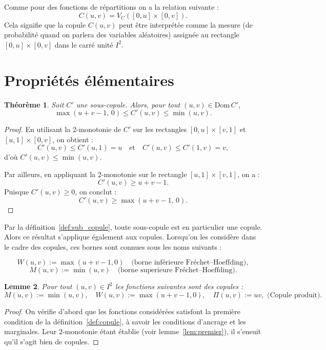 \documentclass[a4paper,11pt]{amsbook}
\numberwithin{equation}{chapter}
\newtheorem{theoreme}			     {Théorème}	[chapter]
\newtheorem{lemme}	    [theoreme]	 {Lemme}
\theoremstyle{definition}
\begin{document}
Comme pour des fonctions de répartitions on a la relation suivante :
\[
C(u,v) = V_C([0,u] \times [0,v]).
\]
Cela signifie que la copule \( C(u,v) \) peut être interprétée comme la mesure (de probabilité quand on parlera des variables aléatoires) assignée au rectangle \( [0,u] \times [0,v] \) dans le carré unité \( I^2\).


\section{Propriétés élémentaires}

\begin{theoreme}\label{thm:sub_copula_fretchet}
Soit \( C' \) une sous-copule. Alors, pour tout \( (u,v) \in \mathrm{Dom}\, C' \),
\[
\max(u+v-1,\, 0) \leq C'(u,v) \leq \min(u,v).
\]
\end{theoreme}

\begin{proof}
En utilisant la 2-monotonie de \( C' \) sur les rectangles \( [0,u] \times [v,1] \) et \( [u,1] \times [0,v] \), on obtient :
\[
C'(u,v) \leq C'(u,1) = u \quad \text{et} \quad C'(u,v) \leq C'(1,v) = v,
\]
d'où \( C'(u,v) \leq \min(u,v) \).

Par ailleurs, en appliquant la 2-monotonie sur le rectangle \( [u,1] \times [v,1] \), on a :
\[
C'(u,v) \geq u + v - 1.
\]
Puisque \( C'(u,v) \geq 0 \), on conclut :
\[
C'(u,v) \geq \max(u+v-1,\, 0).
\]
\end{proof}

Par la définition~\ref{def:sub_copule}, toute sous-copule est en particulier une copule. Alors ce résultat s’applique également aux copules.
Lorsqu’on les considère dans le cadre des copules, ces bornes sont connues sous les noms suivants :

\[
W(u,v) := \max(u+v-1, 0) \quad \text{(borne inférieure Fréchet–Hoeffding)},
\]
\[
M(u,v) := \min(u,v) \quad \text{(borne superieure Fréchet–Hoeffding)}.
\]

\begin{lemme}
Pour tout $(u,v) \in I^2$ les fonctions suivantes sont des copules :
\[
M(u,v) := \min(u,v),
\quad
W(u,v) := \max(u+v-1,0),
\quad
\Pi(u,v) := uv, \text{ (Copule produit)}.
\]
\end{lemme}

\begin{proof}
On vérifie d’abord que les fonctions considérées satisfont la première condition de la définition~\ref{def:copule}, à savoir les conditions d’ancrage et les marginales. Leur 2-monotonie étant établie (voir lemme~\ref{lem:premier}), il s’ensuit qu’il s’agit bien de copules.
\end{proof}
\end{document}
